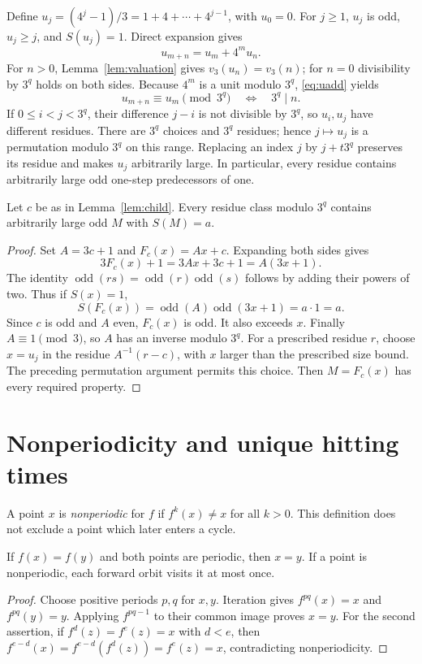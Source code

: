 Define $u_j=(4^j-1)/3=1+4+\cdots+4^{j-1}$, with $u_0=0$.
For $j\ge1$, $u_j$ is odd, $u_j\ge j$, and $S(u_j)=1$.
Direct expansion gives
\begin{equation}\label{eq:uadd}
 u_{m+n}=u_m+4^m u_n.
\end{equation}
For $n>0$, Lemma~\ref{lem:valuation} gives
$v_3(u_n)=v_3(n)$; for $n=0$ divisibility by $3^q$ holds on both sides.
Because $4^m$ is a unit modulo $3^q$, \eqref{eq:uadd} yields
\begin{equation}\label{eq:upermutation}
 u_{m+n}\equiv u_m\pmod{3^q}\quad\Longleftrightarrow\quad3^q\mid n.
\end{equation}
If $0\le i<j<3^q$, their difference $j-i$ is not divisible by $3^q$,
so $u_i,u_j$ have different residues. There are $3^q$ choices and $3^q$
residues; hence $j\mapsto u_j$ is a permutation modulo $3^q$ on this range.
Replacing an index $j$ by $j+t3^q$ preserves its residue and makes $u_j$
arbitrarily large. In particular, every residue contains arbitrarily
large odd one-step predecessors of one.

\begin{lemma}\label{lem:affine}
Let $c$ be as in Lemma~\ref{lem:child}. Every residue class modulo $3^q$
contains arbitrarily large odd $M$ with $S(M)=a$.
\end{lemma}
\begin{proof}
Set $A=3c+1$ and $F_c(x)=Ax+c$. Expanding both sides gives
\[
 3F_c(x)+1=3Ax+3c+1=A(3x+1).
\]
The identity $\operatorname{odd}(rs)=\operatorname{odd}(r)
\operatorname{odd}(s)$ follows by adding their powers of two.
Thus if $S(x)=1$,
\[
 S(F_c(x))=\operatorname{odd}(A)\operatorname{odd}(3x+1)=a\cdot1=a.
\]
Since $c$ is odd and $A$ even, $F_c(x)$ is odd. It also exceeds $x$.
Finally $A\equiv1\pmod3$, so $A$ has an inverse modulo $3^q$.
For a prescribed residue $r$, choose $x=u_j$ in the residue
$A^{-1}(r-c)$, with $x$ larger than the prescribed size bound.
The preceding permutation argument permits this choice. Then $M=F_c(x)$
has every required property.
\end{proof}

\section{Nonperiodicity and unique hitting times}
A point $x$ is \emph{nonperiodic} for $f$ if $f^k(x)\ne x$ for all $k>0$.
This definition does not exclude a point which later enters a cycle.

\begin{lemma}\label{lem:periodic}
If $f(x)=f(y)$ and both points are periodic, then $x=y$.
If a point is nonperiodic, each forward orbit visits it at most once.
\end{lemma}
\begin{proof}
Choose positive periods $p,q$ for $x,y$. Iteration gives
$f^{pq}(x)=x$ and $f^{pq}(y)=y$. Applying $f^{pq-1}$ to their common
image proves $x=y$. For the second assertion, if
$f^d(z)=f^e(z)=x$ with $d<e$, then
$f^{e-d}(x)=f^{e-d}(f^d(z))=f^e(z)=x$, contradicting nonperiodicity.
\end{proof}

